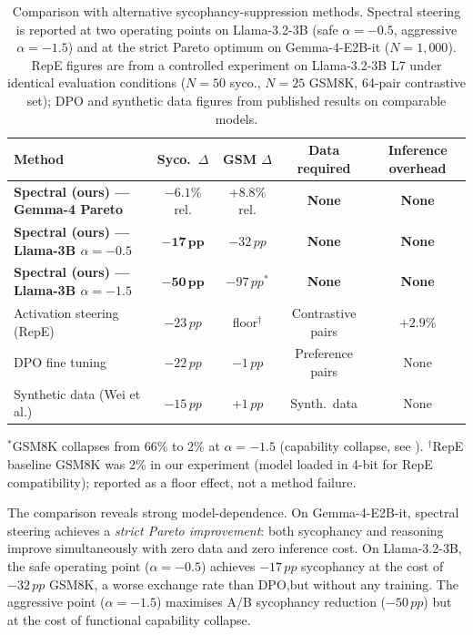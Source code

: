 \documentclass{article}
\newcommand{\pp}{\,pp}
\begin{document}
\begin{table}[h]
\centering\small
\caption{Comparison with alternative sycophancy-suppression methods.
Spectral steering is reported at two operating points on Llama-3.2-3B
(safe $\alpha{=}{-}0.5$, aggressive $\alpha{=}{-}1.5$) and at the strict
Pareto optimum on Gemma-4-E2B-it ($N{=}1{,}000$). RepE figures are from a
controlled experiment on Llama-3.2-3B L7 under identical evaluation
conditions ($N{=}50$ syco., $N{=}25$ GSM8K, 64-pair contrastive set);
DPO and synthetic data figures from published results on comparable models.}
\label{tab:comparison}
\begin{tabular}{lcccc}
\toprule
Method & Syco.\ $\Delta$ & GSM $\Delta$ & Data required &
 Inference overhead \\
\midrule
\rowcolor{pcgreenlt!40}
\textbf{Spectral (ours) — Gemma-4 Pareto} & $\mathbf{-6.1\%}$ rel. & $\mathbf{+8.8\%}$ rel. & \textbf{None} & \textbf{None} \\
\textbf{Spectral (ours) — Llama-3B $\alpha{=}{-}0.5$} & $\mathbf{-17\pp}$ & $-32\pp$ & \textbf{None} & \textbf{None} \\
\textbf{Spectral (ours) — Llama-3B $\alpha{=}{-}1.5$} & $\mathbf{-50\pp}$ & $-97\pp^*$ & \textbf{None} & \textbf{None} \\
\midrule
Activation steering (RepE) & $-23\pp$ & floor$^\dagger$ & Contrastive pairs & $+2.9\%$ \\
DPO fine tuning & $-22\pp$ & $-1\pp$ & Preference pairs & None \\
Synthetic data (Wei et al.) & $-15\pp$ & $+1\pp$ & Synth.\ data & None \\
\bottomrule
\end{tabular}
\vspace{2pt}
{\small $^*$GSM8K collapses from 66\% to 2\% at $\alpha{=}{-}1.5$ (capability collapse, see ).
$^\dagger$RepE baseline GSM8K was 2\% in our experiment (model loaded in 4-bit for RepE compatibility); reported as a floor effect, not a method failure.}
\end{table}

The comparison reveals strong model-dependence. On Gemma-4-E2B-it, spectral
steering achieves a \emph{strict Pareto improvement}: both sycophancy and
reasoning improve simultaneously with zero data and zero inference cost.
On Llama-3.2-3B, the safe operating point ($\alpha{=}{-}0.5$) achieves
$-17\pp$ sycophancy at the cost of $-32\pp$ GSM8K, a worse exchange rate
than DPO,but without any training. The aggressive point ($\alpha{=}{-}1.5$)
maximises A/B sycophancy reduction ($-50\pp$) but at the cost of functional
capability collapse.
\end{document}
